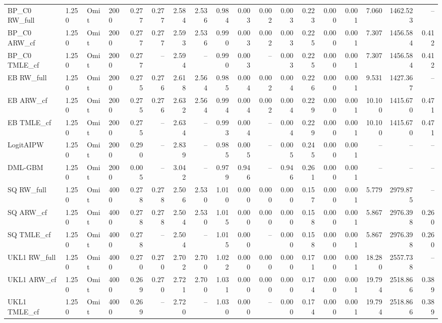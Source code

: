 \begin{tabular}{llllrrrrrrrrrrrrrr}
BP\_C0 RW\_full & 1.250 & Omit & 2000 & 0.277 & 0.277 & 2.584 & 2.536 & 0.984 & 0.003 & 0.002 & 0.003 & 0.223 & 0.000 & 0.001 & 7.060 & 1462.523 & -- \\
BP\_C0 ARW\_cf & 1.250 & Omit & 2000 & 0.277 & 0.277 & 2.593 & 2.536 & 0.990 & 0.003 & 0.002 & 0.003 & 0.225 & 0.000 & 0.001 & 7.307 & 1456.584 & 0.412 \\
BP\_C0 TMLE\_cf & 1.250 & Omit & 2000 & 0.277 & -- & 2.594 & -- & 0.990 & 0.003 & -- & 0.003 & 0.225 & 0.000 & 0.001 & 7.307 & 1456.584 & 0.412 \\
EB RW\_full & 1.250 & Omit & 2000 & 0.275 & 0.276 & 2.618 & 2.564 & 0.985 & 0.004 & 0.002 & 0.004 & 0.226 & 0.000 & 0.001 & 9.531 & 1427.367 & -- \\
EB ARW\_cf & 1.250 & Omit & 2000 & 0.275 & 0.276 & 2.632 & 2.564 & 0.994 & 0.004 & 0.002 & 0.004 & 0.229 & 0.000 & 0.001 & 10.100 & 1415.670 & 0.471 \\
EB TMLE\_cf & 1.250 & Omit & 2000 & 0.275 & -- & 2.634 & -- & 0.993 & 0.004 & -- & 0.004 & 0.229 & 0.000 & 0.001 & 10.100 & 1415.670 & 0.471 \\
LogitAIPW & 1.250 & Omit & 2000 & 0.290 & -- & 2.839 & -- & 0.985 & 0.005 & -- & 0.005 & 0.245 & 0.000 & 0.001 & -- & -- & -- \\
DML-GBM & 1.250 & Omit & 2000 & 0.005 & -- & 3.042 & -- & 0.979 & 0.946 & -- & 0.946 & 0.261 & 0.000 & 0.001 & -- & -- & -- \\
SQ RW\_full & 1.250 & Omit & 4000 & 0.278 & 0.278 & 2.506 & 2.530 & 1.010 & 0.000 & 0.000 & 0.000 & 0.157 & 0.000 & 0.001 & 5.779 & 2979.875 & -- \\
SQ ARW\_cf & 1.250 & Omit & 4000 & 0.278 & 0.278 & 2.504 & 2.530 & 1.015 & 0.000 & 0.000 & 0.000 & 0.158 & 0.000 & 0.001 & 5.867 & 2976.398 & 0.260 \\
SQ TMLE\_cf & 1.250 & Omit & 4000 & 0.278 & -- & 2.504 & -- & 1.015 & 0.000 & -- & 0.000 & 0.158 & 0.000 & 0.001 & 5.867 & 2976.398 & 0.260 \\
UKL1 RW\_full & 1.250 & Omit & 4000 & 0.270 & 0.270 & 2.702 & 2.700 & 1.022 & 0.000 & 0.000 & 0.000 & 0.171 & 0.000 & 0.001 & 18.280 & 2557.738 & -- \\
UKL1 ARW\_cf & 1.250 & Omit & 4000 & 0.269 & 0.270 & 2.721 & 2.700 & 1.031 & 0.000 & 0.000 & 0.000 & 0.174 & 0.000 & 0.001 & 19.794 & 2518.866 & 0.389 \\
UKL1 TMLE\_cf & 1.250 & Omit & 4000 & 0.269 & -- & 2.720 & -- & 1.030 & 0.000 & -- & 0.000 & 0.174 & 0.000 & 0.001 & 19.794 & 2518.866 & 0.389 \\

\end{tabular}
